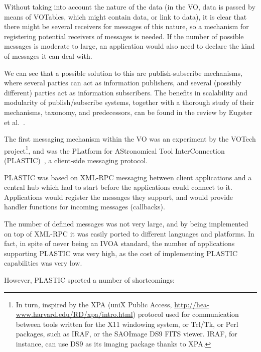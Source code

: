 		Without taking into account the nature of the data (in 
		the VO, data is passed by means of VOTables, which might
		contain data, or link to data), it is clear that there
		might be several receivers for messages of this nature,
		so a mechanism for registering potential receivers of
		messages is needed. If the number of possible messages
		is moderate to large, an application would also need to
		declare the kind of messages it can deal with.
		
		We can see that a possible solution to this are
		publish-subscribe mechanisms, where several parties can
		act as information publishers, and several (possibly
		different) parties act as information subscribers.
		The benefits in scalability and modularity of
		publish/subscribe systems, together
		with a thorough study of their mechanisms, taxonomy, and
		predecessors, can be found in the review by
		Eugster et al.~\cite{857078}.
		
		The first messaging mechanism within the VO was an
		experiment by the VOTech project\footnote{In turn, inspired
		by the XPA (uniX Public Access,
		\url{http://hea-www.harvard.edu/RD/xpa/intro.html})
		protocol used for
		communication between tools written for the X11
		windowing system, or Tcl/Tk, or Perl packages, such as
		IRAF, or the SAOImage DS9 FITS
		viewer. IRAF, for instance, can use DS9 as its imaging
		package thanks to XPA.}, and was the PLatform for
		AStronomical Tool
		InterConnection
		(PLASTIC)~\cite{2006pldaivoanv0606B}, a client-side
		messaging protocol.
		
		PLASTIC was based on XML-RPC messaging between client
		applications and a central hub which had to start before
		the applications could connect to it. Applications would
		register the messages they support, and would provide
		handler functions for incoming messages (callbacks).
		
		The number of defined messages was not very large, and
		by being implemented on top of XML-RPC it was easily
		ported to different languages and platforms. In fact,
		in spite of never being an IVOA standard, the number of
		applications supporting PLASTIC was very high, as the
		cost of implementing PLASTIC capabilities was very
		low.
		
		However, PLASTIC sported a number of shortcomings:
		
